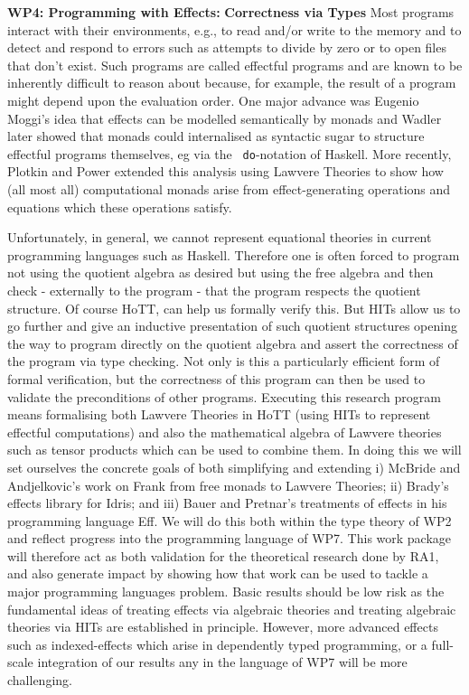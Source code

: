\documentclass[a4paper,11pt]{article}
\begin{document}
{\bf WP4: Programming with Effects:} {\bf Correctness via Types} Most
programs interact with their environments, e.g., to read and/or write
to the memory and to detect and respond to errors such as attempts to
divide by zero or to open files that don’t exist. Such programs are
called effectful programs and are known to be inherently difficult to
reason about because, for example, the result of a program might
depend upon the evaluation order. One major advance was Eugenio
Moggi’s idea that effects can be modelled semantically by monads and
Wadler later showed that monads could internalised as syntactic sugar
to structure effectful programs themselves, eg via the {\tt
  do}-notation of Haskell. More recently, Plotkin and Power extended
this analysis using Lawvere Theories to show how (all most all)
computational monads arise from effect-generating operations and
equations which these operations satisfy.

Unfortunately, in general, we cannot represent equational theories in
current programming languages such as Haskell. Therefore one is often
forced to program not using the quotient algebra as desired but using
the free algebra and then check - externally to the program - that the
program respects the quotient structure. Of course HoTT, can help us
formally verify this. But HITs allow us to go further and give an
inductive presentation of such quotient structures opening the way to
program directly on the quotient algebra and assert the correctness of
the program via type checking. Not only is this a particularly
efficient form of formal verification, but the correctness of this
program can then be used to validate the preconditions of other
programs. Executing this research program means formalising both
Lawvere Theories in HoTT (using HITs to represent effectful
computations) and also the mathematical algebra of Lawvere theories
such as tensor products which can be used to combine them. In doing
this we will set ourselves the concrete goals of both simplifying and
extending i) McBride and Andjelkovic's work on Frank from free monads
to Lawvere Theories; ii) Brady's effects library for Idris; and iii)
Bauer and Pretnar's treatments of effects in his programming language
Eff.  We will do this both within the type theory of WP2 and reflect
progress into the programming language of WP7.  This work package will
therefore act as both validation for the theoretical research done by
RA1, and also generate impact by showing how that work can be used to
tackle a major programming languages problem. Basic results should be
low risk as the fundamental ideas of treating effects via algebraic
theories and treating algebraic theories via HITs are established in
principle. However, more advanced effects such as indexed-effects
which arise in dependently typed programming, or a full-scale integration
of our results any in the language of WP7 will be more challenging.
\end{document}

